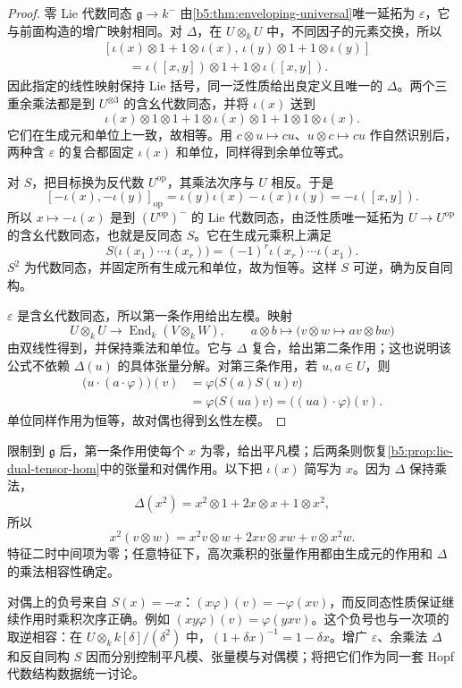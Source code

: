 \begin{proof}
	零 Lie 代数同态 \(\mathfrak g\to k^{-}\) 由\cref{b5:thm:enveloping-universal}唯一延拓为 \(\varepsilon\)，它与前面构造的增广映射相同。对 \(\Delta\)，在 \(U\otimes_k U\) 中，不同因子的元素交换，所以
	\[
		\begin{aligned}
			&[\iota(x)\otimes1+1\otimes\iota(x),\, \iota(y)\otimes1+1\otimes\iota(y)]\\
			&\qquad=\iota([x,y])\otimes1+1\otimes\iota([x,y]).
		\end{aligned}
	\]
	因此指定的线性映射保持 Lie 括号，同一泛性质给出良定义且唯一的 \(\Delta\)。两个三重余乘法都是到 \(U^{\otimes3}\) 的含幺代数同态，并将 \(\iota(x)\) 送到
	\[
		\iota(x)\otimes1\otimes1 +1\otimes\iota(x)\otimes1 +1\otimes1\otimes\iota(x).
	\]
	它们在生成元和单位上一致，故相等。用 \(c\otimes u\mapsto cu\)、\(u\otimes c\mapsto cu\) 作自然识别后，两种含 \(\varepsilon\) 的复合都固定 \(\iota(x)\) 和单位，同样得到余单位等式。

	对 \(S\)，把目标换为反代数 \(U^{\mathrm{op}}\)，其乘法次序与 \(U\) 相反。于是
	\[
		[-\iota(x),-\iota(y)]_{\mathrm{op}} =\iota(y)\iota(x)-\iota(x)\iota(y) =-\iota([x,y]).
	\]
	所以 \(x\mapsto-\iota(x)\) 是到 \((U^{\mathrm{op}})^{-}\) 的 Lie 代数同态，由泛性质唯一延拓为 \(U\to U^{\mathrm{op}}\) 的含幺代数同态，也就是反同态 \(S\)。它在生成元乘积上满足
	\[
		S\bigl(\iota(x_1)\cdots\iota(x_r)\bigr) =(-1)^r\iota(x_r)\cdots\iota(x_1).
	\]
	\(S^2\) 为代数同态，并固定所有生成元和单位，故为恒等。这样 \(S\) 可逆，确为反自同构。

	\(\varepsilon\) 是含幺代数同态，所以第一条作用给出左模。映射
	\[
		U\otimes_k U\longrightarrow\operatorname{End}_k(V\otimes_k W),\qquad a\otimes b\longmapsto\bigl(v\otimes w\mapsto av\otimes bw\bigr)
	\]
	由双线性得到，并保持乘法和单位。它与 \(\Delta\) 复合，给出第二条作用；这也说明该公式不依赖 \(\Delta(u)\) 的具体张量分解。对第三条作用，若 \(u,a\in U\)，则
	\[
		\begin{aligned}
			\bigl(u\cdot(a\cdot\varphi)\bigr)(v) &=\varphi\bigl(S(a)S(u)v\bigr)\\
			&=\varphi\bigl(S(ua)v\bigr) =\bigl((ua)\cdot\varphi\bigr)(v).
		\end{aligned}
	\]
	单位同样作用为恒等，故对偶也得到幺性左模。
\end{proof}
限制到 \(\mathfrak g\) 后，第一条作用使每个 \(x\) 为零，给出平凡模；后两条则恢复\cref{b5:prop:lie-dual-tensor-hom}中的张量和对偶作用。以下把 \(\iota(x)\) 简写为 \(x\)。因为 \(\Delta\) 保持乘法，
\[
	\Delta(x^2)=x^2\otimes1+2x\otimes x+1\otimes x^2,
\]
所以
\[
	x^2(v\otimes w)=x^2v\otimes w+2xv\otimes xw+v\otimes x^2w.
\]
特征二时中间项为零；任意特征下，高次乘积的张量作用都由生成元的作用和 \(\Delta\) 的乘法相容性确定。

\ProseParagraphBreak

对偶上的负号来自 \(S(x)=-x\)：\((x\varphi)(v)=-\varphi(xv)\)，而反同态性质保证继续作用时乘积次序正确。例如 \((xy\varphi)(v)=\varphi(yxv)\)。这个负号也与一次项的取逆相容：在 \(U\otimes_k k[\delta]/(\delta^2)\) 中，\((1+\delta x)^{-1}=1-\delta x\)。增广 \(\varepsilon\)、余乘法 \(\Delta\) 和反自同构 \(S\) 因而分别控制平凡模、张量模与对偶模；将把它们作为同一套 Hopf 代数结构数据统一讨论。
